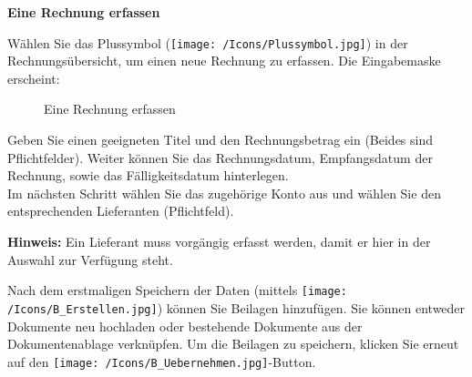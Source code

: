 \vspace{\baselineskip}

\textbf{Eine Rechnung erfassen}

\vspace{\baselineskip}

Wählen Sie das Plussymbol (\texttt{[image: /Icons/Plussymbol.jpg]}) in der Rechnungsübersicht, um einen neue Rechnung zu erfassen. Die Eingabemaske erscheint:

\begin{figure}[H]
\caption{Eine Rechnung erfassen}
\end{figure}

Geben Sie einen geeigneten Titel und den Rechnungsbetrag ein (Beides sind Pflichtfelder). Weiter können Sie das Rechnungsdatum, Empfangsdatum der Rechnung, sowie das Fälligkeitsdatum hinterlegen. \\
Im nächsten Schritt wählen Sie das zugehörige Konto aus und wählen Sie den entsprechenden Lieferanten (Pflichtfeld).

\vspace{\baselineskip}

\textbf{Hinweis:} Ein Lieferant muss vorgängig erfasst werden, damit er hier in der Auswahl zur Verfügung steht.

\vspace{\baselineskip}

Nach dem erstmaligen Speichern der Daten (mittels \texttt{[image: /Icons/B\_Erstellen.jpg]}) können Sie Beilagen hinzufügen. Sie können entweder Dokumente neu hochladen oder bestehende Dokumente aus der Dokumentenablage verknüpfen. Um die Beilagen zu speichern, klicken Sie erneut auf den \texttt{[image: /Icons/B\_Uebernehmen.jpg]}-Button. 

